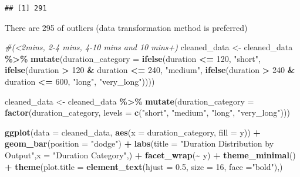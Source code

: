 \documentclass[
]{article}
\newenvironment{Shaded}{\begin{snugshade}}{\end{snugshade}}
\newcommand{\AttributeTok}[1]{\textcolor[rgb]{0.13,0.29,0.53}{#1}}
\newcommand{\CommentTok}[1]{\textcolor[rgb]{0.56,0.35,0.01}{\textit{#1}}}
\newcommand{\DecValTok}[1]{\textcolor[rgb]{0.00,0.00,0.81}{#1}}
\newcommand{\FloatTok}[1]{\textcolor[rgb]{0.00,0.00,0.81}{#1}}
\newcommand{\FunctionTok}[1]{\textcolor[rgb]{0.13,0.29,0.53}{\textbf{#1}}}
\newcommand{\NormalTok}[1]{#1}
\newcommand{\OtherTok}[1]{\textcolor[rgb]{0.56,0.35,0.01}{#1}}
\newcommand{\SpecialCharTok}[1]{\textcolor[rgb]{0.81,0.36,0.00}{\textbf{#1}}}
\newcommand{\StringTok}[1]{\textcolor[rgb]{0.31,0.60,0.02}{#1}}
\begin{document}
\begin{verbatim}
## [1] 291
\end{verbatim}

There are 295 of outliers (data transformation method is preferred)

\begin{Shaded}
\begin{Highlighting}[]
\CommentTok{\#(\textless{}2mins, 2{-}4 mins, 4{-}10 mins and 10 mins+)}
\NormalTok{cleaned\_data }\OtherTok{\textless{}{-}}\NormalTok{ cleaned\_data }\SpecialCharTok{\%\textgreater{}\%}
  \FunctionTok{mutate}\NormalTok{(}\AttributeTok{duration\_category =} \FunctionTok{ifelse}\NormalTok{(duration }\SpecialCharTok{\textless{}=} \DecValTok{120}\NormalTok{, }\StringTok{"short"}\NormalTok{, }
                             \FunctionTok{ifelse}\NormalTok{(duration }\SpecialCharTok{\textgreater{}} \DecValTok{120} \SpecialCharTok{\&}\NormalTok{ duration }\SpecialCharTok{\textless{}=} \DecValTok{240}\NormalTok{, }\StringTok{"medium"}\NormalTok{,}
                             \FunctionTok{ifelse}\NormalTok{(duration }\SpecialCharTok{\textgreater{}} \DecValTok{240} \SpecialCharTok{\&}\NormalTok{ duration }\SpecialCharTok{\textless{}=} \DecValTok{600}\NormalTok{, }\StringTok{"long"}\NormalTok{, }\StringTok{"very\_long"}\NormalTok{))))}

\NormalTok{cleaned\_data }\OtherTok{\textless{}{-}}\NormalTok{ cleaned\_data }\SpecialCharTok{\%\textgreater{}\%}
  \FunctionTok{mutate}\NormalTok{(}\AttributeTok{duration\_category =} \FunctionTok{factor}\NormalTok{(duration\_category, }\AttributeTok{levels =} \FunctionTok{c}\NormalTok{(}\StringTok{"short"}\NormalTok{, }\StringTok{"medium"}\NormalTok{, }\StringTok{"long"}\NormalTok{, }\StringTok{"very\_long"}\NormalTok{)))}

\FunctionTok{ggplot}\NormalTok{(}\AttributeTok{data =}\NormalTok{ cleaned\_data, }\FunctionTok{aes}\NormalTok{(}\AttributeTok{x =}\NormalTok{ duration\_category, }\AttributeTok{fill =}\NormalTok{ y)) }\SpecialCharTok{+} \FunctionTok{geom\_bar}\NormalTok{(}\AttributeTok{position =} \StringTok{"dodge"}\NormalTok{) }\SpecialCharTok{+}  \FunctionTok{labs}\NormalTok{(}\AttributeTok{title =} \StringTok{"Duration Distribution by Output"}\NormalTok{,}\AttributeTok{x =} \StringTok{"Duration Category"}\NormalTok{,) }\SpecialCharTok{+}  
  \FunctionTok{facet\_wrap}\NormalTok{(}\SpecialCharTok{\textasciitilde{}}\NormalTok{ y) }\SpecialCharTok{+} \FunctionTok{theme\_minimal}\NormalTok{() }\SpecialCharTok{+} \FunctionTok{theme}\NormalTok{(}\AttributeTok{plot.title =} \FunctionTok{element\_text}\NormalTok{(}\AttributeTok{hjust =} \FloatTok{0.5}\NormalTok{, }\AttributeTok{size =} \DecValTok{16}\NormalTok{, }\AttributeTok{face =}\StringTok{"bold"}\NormalTok{),)}
\end{Highlighting}
\end{Shaded}
\end{document}

